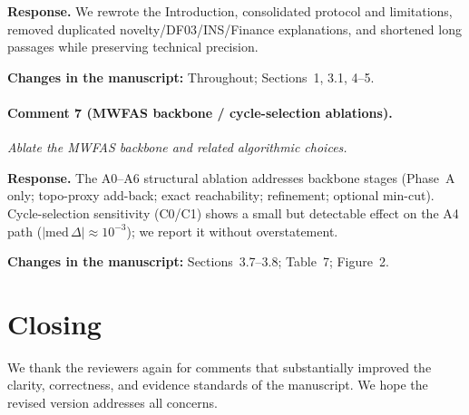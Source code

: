 \documentclass[11pt]{article}
\newcommand{\commentbox}[1]{\par\textit{#1}\par\medskip}
\newcommand{\changes}[1]{\textbf{Changes in the manuscript:} #1\par\medskip}
\begin{document}
\noindent\textbf{Response.}
We rewrote the Introduction, consolidated protocol and limitations, removed duplicated novelty/DF03/INS/Finance explanations, and shortened long passages while preserving technical precision.

\changes{Throughout; Sections~1, 3.1, 4--5.}

\paragraph{Comment 7 (MWFAS backbone / cycle-selection ablations).}
\commentbox{Ablate the MWFAS backbone and related algorithmic choices.}

\noindent\textbf{Response.}
The A0--A6 structural ablation addresses backbone stages (Phase~A only; topo-proxy add-back; exact reachability; refinement; optional min-cut). Cycle-selection sensitivity (C0/C1) shows a small but detectable effect on the A4 path ($|\mathrm{med}\,\Delta|\approx 10^{-3}$); we report it without overstatement.

\changes{Sections~3.7--3.8; Table~7; Figure~2.}

\section*{Closing}

We thank the reviewers again for comments that substantially improved the clarity, correctness, and evidence standards of the manuscript. We hope the revised version addresses all concerns.
\end{document}
